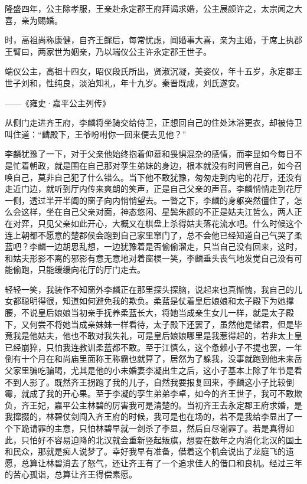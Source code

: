 隆盛四年，公主除孝服，王亲赴永定郡王府拜谒求婚，公主展颜许之，太宗闻之大喜，亲为赐婚。

时，高祖尚称康健，自齐王鳏后，每常忧虑，闻婚事大喜，亲为主婚，于席上执郡王臂曰，两家世为姻亲，乃以端仪公主许永定郡王世子。

端仪公主，高祖十四女，昭仪段氏所出，贤淑沉凝，美姿仪，年十五岁，永定郡王世子刘和，性纯良，淡泊知礼，年十九岁。秦晋既成，刘氏遂安。

——《雍史·嘉平公主列传》

从侧门走进齐王府，李麟将坐骑交给侍卫，正想回自己的住处沐浴更衣，却被侍卫叫住道：“麟殿下，王爷吩咐你一回来便去见他？”

李麟犹豫了一下，对于父亲他始终抱着仰慕和畏惧混杂的感情，而李显如今每日不是忙着朝政，就是围在自己那对孪生弟妹的身边，根本就没有时间管自己，如今召唤自己，莫非自己犯了什么错么。当下他不敢犹豫，匆匆走到内宅的花厅，还没有走近门边，就听到厅内传来爽朗的笑声，正是自己父亲的声音。李麟悄悄走到花厅一侧，透过半开半阖的窗子向内悄悄望去。一瞥之下，李麟的身躯突然僵住了，怎么会这样，坐在自己父亲对面，神态悠闲、星鬓朱颜的不正是姑夫江哲么，两人正在对弈，只见父亲如此开心，大概又在棋盘上杀得姑夫落花流水吧。什么时候这个连上朝都不愿意的楚郡侯会跑到自己家里窜门了，总不会他已经知道自己气哭了柔蓝吧？李麟一边胡思乱想，一边犹豫着是否偷偷溜走，只当自己没有回来，这时，和姑夫形影不离的邪影有意无意地对着窗棂一笑，李麟垂头丧气地发觉自己没有可能偷跑，只能缓缓向花厅的厅门走去。

轻轻一笑，我装作不知窗外李麟正在那里探头探脑，说起来也真惭愧，我自己的儿女都聪明得很，知道如何避免我的欺负。柔蓝是仗着皇后娘娘和太子殿下为她撑腰，不说皇后娘娘当初亲手抚养柔蓝长大，将她当成亲生女儿一样，就是太子殿下，又何尝不将她当成亲妹妹一样看待，太子殿下还罢了，虽然他是储君，但是毕竟我是他姑夫，他也不敢对我失礼，可是皇后娘娘哪里是我惹得起的，若非太上皇已经崩猝，只怕我连教训柔蓝都不敢。至于江慎么，这个惫赖小子不提也罢，一年倒有十个月在和尚庙里面称王称霸也就算了，居然为了躲我，没事就跑到他未来岳父家里骗吃骗喝，尤其是他的小未婚妻李凝出生之后，这小子基本上除了年节是看不到人影了。既然齐王拐跑了我的儿子，自然我要报复回来，李麟这小子比较倒霉，就成了我的开心果。至于李凝的孪生弟弟李卓，如今的齐王世子，我可不敢欺负，齐王妃，嘉平公主林碧的厉害我可是清楚的。当初齐王去永定郡王府求婚，是我撺掇的，林碧仗剑闯入齐王府的时候，我可是也在场的，若不是我给李显出了一个下跪请罪的主意，只怕林碧早就一剑杀了李显，然后自尽谢罪了。若是真得如此，只怕好不容易迫降的北汉就会重新竖起叛旗，想要在数年之内消化北汉的国土和民众，那就是痴人说梦了。幸好我早有准备，借着这个机会说出了龙庭飞的遗愿，总算让林碧消去了怒气，还让齐王有了一个追求佳人的借口和良机。经过三年的苦心孤诣，总算让齐王得偿素愿。

